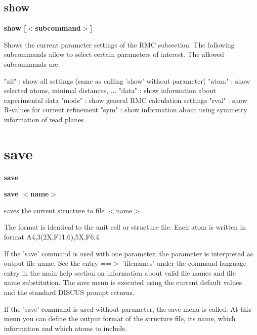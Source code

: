 \subsection*{show}
{\bf show [$ <$subcommand$> $] \par }
\par
\vspace{3pt}
Shows the current parameter settings of the RMC subsection. The following 
subcommands allow to select certain parameters of interest. The allowed 
subcommands are: 
\par
\begin{MacVerbatim}
"all"  : show all settings (same as calling 'show' without parameter)
"atom" : show selected atoms, minimal distances, ...
"data" : show information about experimental data
"mode" : show general RMC calculation settings
"rval" : show R-values for current refinement
"sym"  : show information about using symmetry information of read planes
\end{MacVerbatim}
\section{save}
{\bf save \par }
{\bf save $ <$name$> $ \par }
\par
\vspace{3pt}
saves the current structure to file $ <$name$> $ 
\par
The format is identical to the unit cell or structure file. Each 
atom is written in format A4,3(2X,F11.6),5X,F6.4 
\par
If the 'save' command is used with one parameter, the 
parameter is interpreted as output file name. See the entry 
==$> $ 'filenames' under the command language entry in the main help 
section on information about valid file names and file name substitution. 
The save menu is executed using the current default values and the 
standard DISCUS prompt returns. 
\par
If the 'save' command is used without parameter, the save menu is 
called. At this menu you can define the output format of the structure 
file, its name, which information and which atoms to include. 
\par
